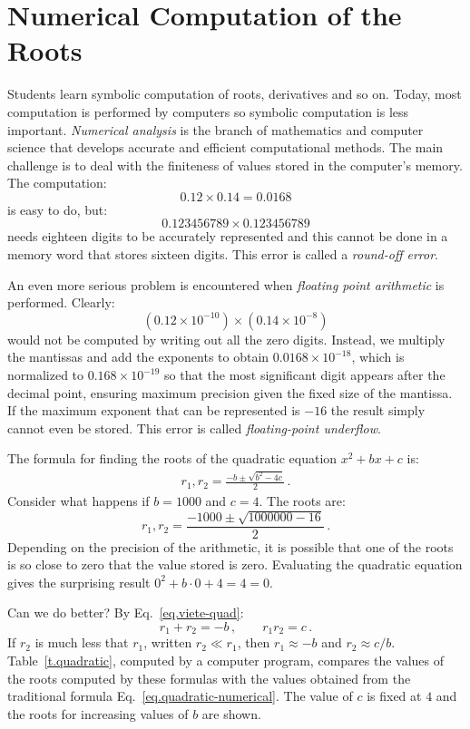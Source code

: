 \section{Numerical Computation of the Roots}\label{s.numerical}

Students learn symbolic computation of roots, derivatives and so on. Today, most computation is performed by computers so symbolic computation is less important. \emph{Numerical analysis} is the branch of mathematics and computer science that develops accurate and efficient computational methods. The main challenge is to deal with the finiteness of values stored in the computer's memory. The computation:
\[0.12\times 0.14=0.0168\]
is easy to do, but:
\[
0.123456789\times 0.123456789\]
needs eighteen digits to be accurately represented and this cannot be done in a memory word that stores sixteen digits. This error is called a \emph{round-off error}.

An even more serious problem is encountered when \emph{floating point arithmetic} is performed. Clearly:
\[(0.12\times 10^{-10})\times (0.14\times 10^{-8})\]
would not be computed by writing out all the zero digits. Instead, we multiply the mantissas and add the exponents to obtain $0.0168\times 10^{-18}$, which is normalized to $0.168\times 10^{-19}$ so that the most significant digit appears after the decimal point, ensuring maximum precision given the fixed size of the mantissa. If the maximum exponent that can be represented is $-16$ the result simply cannot even be stored. This error is called \emph{floating-point underflow}.

\newpage

The formula for finding the roots of the quadratic equation $x^2+bx+c$ is:
\begin{align}
r_1, r_2 = \frac{-b\pm\sqrt{b^2-4c}}{2}\,.\label{eq.quadratic-numerical}
\end{align}
Consider what happens if $b=1000$ and $c=4$. The roots are:
\[
r_1, r_2 = \frac{-1000\pm\sqrt{1000000-16}}{2}\,.
\]
Depending on the precision of the arithmetic, it is possible that one of the roots is so close to zero that the value stored is zero. Evaluating the quadratic equation gives the surprising result $0^2+b\cdot 0 +4= 4= 0$.

Can we do better? By Eq.~\ref{eq.viete-quad}:
\[
r_1+r_2 = -b\,,\quad\quad r_1r_2=c\,.
\]
If $r_2$ is much less that $r_1$, written $r_2\ll r_1$, then $r_1\approx -b$ and $r_2\approx c/b$. Table~\ref{t.quadratic}, computed by a computer program, compares the values of the roots computed by these formulas with the values obtained from the traditional formula Eq.~\ref{eq.quadratic-numerical}. The value of $c$ is fixed at $4$ and the roots for increasing values of $b$ are shown.

